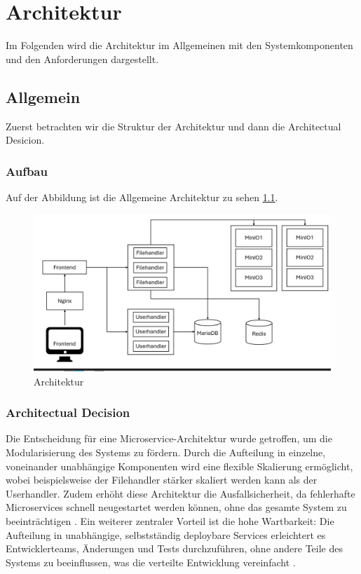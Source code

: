 \documentclass[12pt]{report}
\begin{document}
\begin{acronym}[SOAP]
\end{acronym}


\addtocounter{frontmatterPage}{\value{page}} 

\newpage
{}
\chapter{Architektur}
	Im Folgenden wird die Architektur im Allgemeinen mit den Systemkomponenten und den Anforderungen dargestellt.
	\section{Allgemein}
		Zuerst betrachten wir die Struktur der Architektur und dann die Architectual Desicion.
		\subsection{Aufbau}
			Auf der Abbildung ist die Allgemeine Architektur zu sehen \ref{fig:architektur}.
			\begin{figure}[h]
				\centering
				\includegraphics[width=\linewidth]{architektur}
				\caption{Architektur}
				\label{fig:architektur}
			\end{figure}
			
		\subsection{Architectual Decision}
			Die Entscheidung für eine Microservice-Architektur wurde getroffen, um die Modularisierung des Systems zu fördern. Durch die Aufteilung in einzelne, voneinander unabhängige Komponenten wird eine flexible Skalierung ermöglicht, wobei beispielsweise der Filehandler stärker skaliert werden kann als der Userhandler. Zudem erhöht diese Architektur die Ausfallsicherheit, da fehlerhafte Microservices schnell neugestartet werden können, ohne das gesamte System zu beeinträchtigen \cite{taibi2017processes}. Ein weiterer zentraler Vorteil ist die hohe Wartbarkeit: Die Aufteilung in unabhängige, selbstständig deploybare Services erleichtert es Entwicklerteams, Änderungen und Tests durchzuführen, ohne andere Teile des Systems zu beeinflussen, was die verteilte Entwicklung vereinfacht \cite{de2019monolithic}.
			
\end{document}
